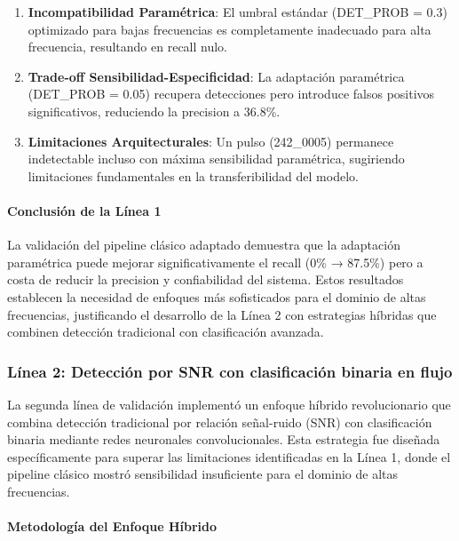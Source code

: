 \begin{enumerate}
    \item \textbf{Incompatibilidad Paramétrica}: El umbral estándar (DET\_PROB = 0.3) optimizado para bajas frecuencias es completamente inadecuado para alta frecuencia, resultando en recall nulo.
    
    \item \textbf{Trade-off Sensibilidad-Especificidad}: La adaptación paramétrica (DET\_PROB = 0.05) recupera detecciones pero introduce falsos positivos significativos, reduciendo la precision a 36.8\%.
    
    \item \textbf{Limitaciones Arquitecturales}: Un pulso (242\_0005) permanece indetectable incluso con máxima sensibilidad paramétrica, sugiriendo limitaciones fundamentales en la transferibilidad del modelo.
\end{enumerate}

\paragraph{Conclusión de la Línea 1}

La validación del pipeline clásico adaptado demuestra que la adaptación paramétrica puede mejorar significativamente el recall (0\% → 87.5\%) pero a costa de reducir la precision y confiabilidad del sistema. Estos resultados establecen la necesidad de enfoques más sofisticados para el dominio de altas frecuencias, justificando el desarrollo de la Línea 2 con estrategias híbridas que combinen detección tradicional con clasificación avanzada.

\subsubsection{Línea 2: Detección por SNR con clasificación binaria en flujo}

La segunda línea de validación implementó un enfoque híbrido revolucionario que combina detección tradicional por relación señal-ruido (SNR) con clasificación binaria mediante redes neuronales convolucionales. Esta estrategia fue diseñada específicamente para superar las limitaciones identificadas en la Línea 1, donde el pipeline clásico mostró sensibilidad insuficiente para el dominio de altas frecuencias.

\paragraph{Metodología del Enfoque Híbrido}

